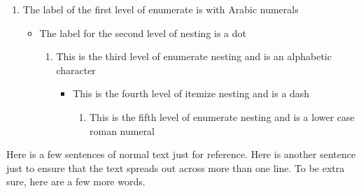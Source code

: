 \documentclass{article}
\begin{document}
\begin{enumerate}
	\item The label of the first level of enumerate is with Arabic numerals
	\begin{itemize}
		\item The label for the second level of nesting is a dot
		\begin{enumerate}
			\item This is the third level of enumerate nesting and is an alphabetic character
			\begin{itemize}
				\item This is the fourth level of itemize nesting and is a dash
				\begin{enumerate}
					\item This is the fifth level of enumerate nesting and is a lower case roman numeral
				\end{enumerate}
			\end{itemize}
		\end{enumerate}
	\end{itemize}
\end{enumerate}

Here is a few sentences of normal text just for reference. Here is another sentence
just to ensure that the text spreads out across more than one line. To be extra sure,
here are a few more words.
\end{document}
